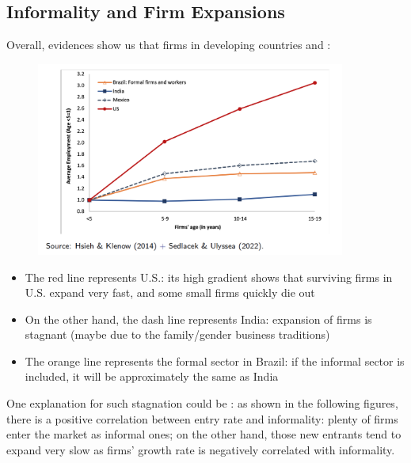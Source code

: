            \subsection{Informality and Firm Expansions}
                Overall, evidences show us that firms in developing countries  and :
                \begin{figure}[H]
                    \centering
                    \includegraphics[width=4in]{images/ch5/dynamics_1.png}
                    \caption{}
                \end{figure}
                \begin{itemize}
                    \item The red line represents U.S.: its high gradient shows that surviving firms in U.S. expand very fast, and some small firms quickly die out
                    \item On the other hand, the dash line represents India: expansion of firms is stagnant (maybe due to the family/gender business traditions)
                    \item The orange line represents the formal sector in Brazil: if the informal sector is included, it will be approximately the same as India
                \end{itemize}
                One explanation for such stagnation could be : as shown in the following figures, there is a positive correlation between entry rate and informality: plenty of firms enter the market as informal ones; on the other hand, those new entrants tend to expand very slow as firms' growth rate is negatively correlated with informality.
